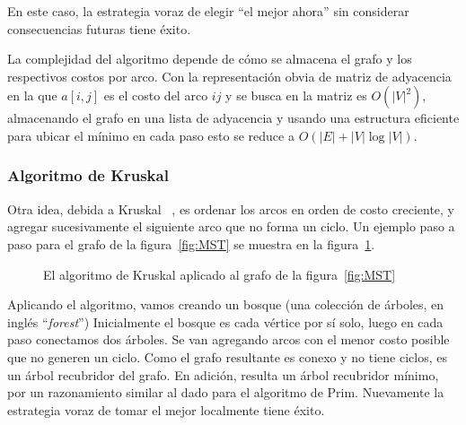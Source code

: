   En este caso,
  la estrategia voraz de elegir ``el mejor ahora''
  sin considerar consecuencias futuras tiene éxito.

  La complejidad del algoritmo depende de cómo se almacena el grafo
  y los respectivos costos por arco.
  Con la representación obvia de matriz de adyacencia
  en la que \(a[i, j]\) es el costo del arco \(i j\)
  y se busca en la matriz es \(O(\lvert V \rvert^2)\),
  almacenando el grafo en una lista de adyacencia
  y usando una estructura eficiente
  para ubicar el mínimo en cada paso
  esto se reduce
  a \(O(\lvert E \rvert + \lvert V \rvert \log \lvert V \rvert)\).

\subsubsection{Algoritmo de Kruskal}
\label{sec:kruskal}

  Otra idea,
  debida a Kruskal~%
    \cite{kruskal56:_short_spann_subtree},
  es ordenar los arcos en orden de costo creciente,
  y agregar sucesivamente el siguiente arco que no forma un ciclo.%
  Un ejemplo paso a paso para el grafo de la figura~\ref{fig:MST}
  se muestra en la figura~\ref{fig:Kruskal}.
  \begin{figure}
    \centering
    \hspace{2em}%

    \hspace{2em}%

    \caption{El algoritmo de Kruskal
	     aplicado al grafo de la figura~\ref{fig:MST}}
    \label{fig:Kruskal}
  \end{figure}

  Aplicando el algoritmo,
  vamos creando un bosque%
  (una colección de árboles,
   en inglés ``\emph{\foreignlanguage{english}{forest}}'')
  Inicialmente el bosque es cada vértice por sí solo,
  luego en cada paso conectamos dos árboles.
  Se van agregando arcos con el menor costo posible
  que no generen un ciclo.
  Como el grafo resultante es conexo y no tiene ciclos,
  es un árbol recubridor del grafo.
  En adición,
  resulta un árbol recubridor mínimo,
  por un razonamiento similar al dado para el algoritmo de Prim.
  Nuevamente la estrategia voraz de tomar el mejor localmente
  tiene éxito.


